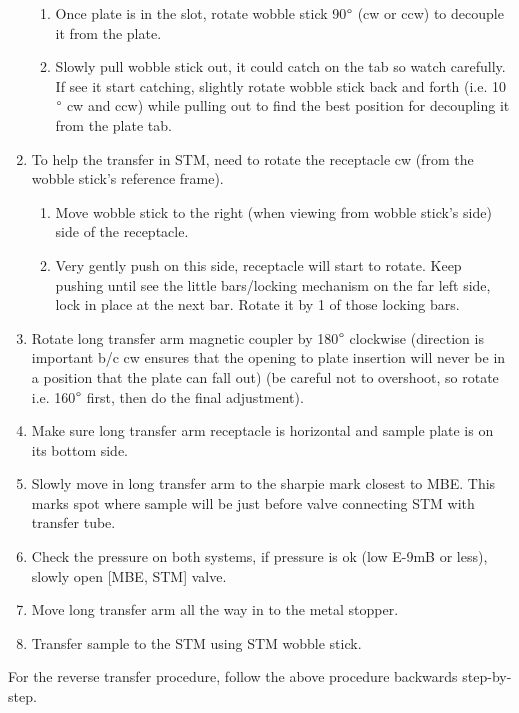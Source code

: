 \begin{enumerate}
\begin{enumerate}
	\item	Once plate is in the slot, rotate wobble stick 90$\degree$ (cw or ccw) to decouple it from the plate. 
	\item	Slowly pull wobble stick out, it could catch on the tab so watch carefully. If see it start catching, slightly rotate wobble stick back and forth (i.e. 10$\degree$ cw and ccw) while pulling out to find the best position for decoupling it from the plate tab. 
\end{enumerate}	
\item	To help the transfer in STM, need to rotate the receptacle cw (from the wobble stick’s reference frame).
	\begin{enumerate}
		\item	Move wobble stick to the right (when viewing from wobble stick’s side) side of the receptacle.
		\item	Very gently push on this side, receptacle will start to rotate. Keep pushing until see the little bars/locking mechanism on the far left side, lock in place at the next bar. Rotate it by 1 of those locking bars.
	\end{enumerate}
\item	Rotate long transfer arm magnetic coupler by 180$\degree$ clockwise (direction is important b/c cw ensures that the opening to plate insertion will never be in a position that the plate can fall out) (be careful not to overshoot, so rotate i.e. 160$\degree$ first, then do the final adjustment). 
\item	Make sure long transfer arm receptacle is horizontal and sample plate is on its bottom side.
\item	Slowly move in long transfer arm to the sharpie mark closest to MBE.  This marks spot where sample will be just before valve connecting STM with transfer tube.
\item	Check the pressure on both systems, if pressure is ok (low E-9mB or less), slowly open [MBE, STM] valve.
\item	Move long transfer arm all the way in to the metal stopper.
\item	Transfer sample to the STM using STM wobble stick.
\end{enumerate}
For the reverse transfer procedure, follow the above procedure backwards step-by-step.
	
